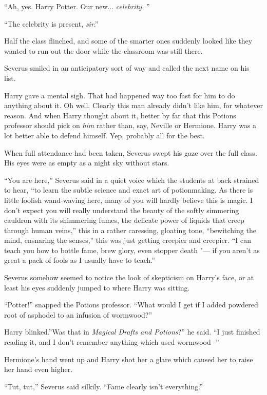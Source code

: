 ``Ah, yes. Harry Potter. Our new... \emph{celebrity.} ''

``The celebrity is present, \emph{sir}.''

Half the class flinched, and some of the smarter ones suddenly looked
like they wanted to run out the door while the classroom was still
there.

Severus smiled in an anticipatory sort of way and called the next name
on his list.

Harry gave a mental sigh. That had happened way too fast for him to do
anything about it. Oh well. Clearly this man already didn't like him,
for whatever reason. And when Harry thought about it, better by far that
this Potions professor should pick on \emph{him} rather than, say,
Neville or Hermione. Harry was a lot better able to defend himself. Yep,
probably all for the best.

When full attendance had been taken, Severus swept his gaze over the
full class. His eyes were as empty as a night sky without stars.

``You are here,'' Severus said in a quiet voice which the students at
back strained to hear, ``to learn the subtle science and exact art of
potionmaking. As there is little foolish wand-waving here, many of you
will hardly believe this is magic. I don't expect you will really
understand the beauty of the softly simmering cauldron with its
shimmering fumes, the delicate power of liquids that creep through human
veins,'' this in a rather caressing, gloating tone, ``bewitching the
mind, ensnaring the senses,'' this was just getting creepier and
creepier. ``I can teach you how to bottle fame, brew glory, even stopper
death "--- if you aren't as great a pack of fools as I usually have to
teach.''

Severus somehow seemed to notice the look of skepticism on Harry's face,
or at least his eyes suddenly jumped to where Harry was sitting.

``Potter!'' snapped the Potions professor. ``What would I get if I added
powdered root of asphodel to an infusion of wormwood?''

Harry blinked.''Was that in \emph{Magical Drafts and Potions}?'' he
said. ``I just finished reading it, and I don't remember anything which
used wormwood -''

Hermione's hand went up and Harry shot her a glare which caused her to
raise her hand even higher.

``Tut, tut,'' Severus said silkily. ``Fame clearly isn't everything.''

